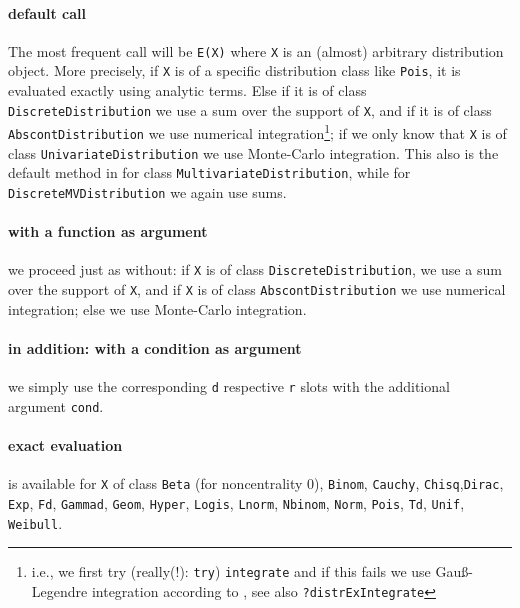 \documentclass[11pt]{article}
\newcommand{\code}[1]{{\tt #1}}
\begin{document}
\paragraph{default call}
The most frequent call will be \code{E(X)} where \code{X} is an (almost) arbitrary distribution object.
More precisely, if \code{X} is of a specific distribution class like \code{Pois}, it is evaluated exactly
using analytic terms. Else if it is of class \code{DiscreteDistribution} we use a sum over the support of \code{X},
and if it is of class \code{AbscontDistribution} we use numerical integration\footnote{i.e., we first try (really(!): \code{try})
\code{integrate} and if this fails we use Gau{\ss}-Legendre integration according to \cite{NumR:92}, see also
\code{?distrExIntegrate}}; if we only know that {\tt X} is of class \code{UnivariateDistribution} we use Monte-Carlo integration.
This also is the default method in for class \code{MultivariateDistribution}, while for \code{DiscreteMVDistribution} we again use sums.
\paragraph{with a function as argument}
 we proceed just as without: if \code{X} is of class \code{DiscreteDistribution}, we use a sum over the support of \code{X},
and if \code{X} is of class \code{AbscontDistribution} we use numerical integration; else we use Monte-Carlo integration.
\paragraph{in addition: with a condition as argument} we simply use the corresponding \code{d} respective \code{r} slots
with the additional argument \code{cond}.
\paragraph{exact evaluation}
is available for \code{X} of class \code{Beta} (for noncentrality $0$), \code{Binom}, \code{Cauchy}, \code{Chisq},\code{Dirac}, \code{Exp}, \code{Fd}, \code{Gammad},
\code{Geom}, \code{Hyper}, \code{Logis}, \code{Lnorm}, \code{Nbinom}, \code{Norm}, \code{Pois}, \code{Td}, \code{Unif}, \code{Weibull}.
\end{document}
